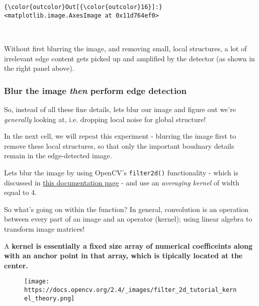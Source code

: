\documentclass[11pt]{article}
\makeatletter
\def\maxwidth{\ifdim\Gin@nat@width>\linewidth\linewidth
    \else\Gin@nat@width\fi}
\let\Oldincludegraphics\includegraphics
\renewcommand{\includegraphics}[1]{\Oldincludegraphics[width=.8\maxwidth]{#1}}
\makeatother
\begin{document}
\begin{Verbatim}[commandchars=\\\{\}]
{\color{outcolor}Out[{\color{outcolor}16}]:} <matplotlib.image.AxesImage at 0x11d764ef0>
\end{Verbatim}
            
    \begin{center}
    \end{center}
    { \hspace*{\fill} \\}
    
    Without first blurring the image, and removing small, local structures,
a lot of irrelevant edge content gets picked up and amplified by the
detector (as shown in the right panel above).

    \subsubsection{\texorpdfstring{Blur the image \emph{then} perform edge
detection}{Blur the image then perform edge detection}}\label{blur-the-image-then-perform-edge-detection}

So, instead of all these fine details, lets blur our image and figure
out we're \emph{generally} looking at, i.e. dropping local noise for
global structure!

In the next cell, we will repeat this experiment - blurring the image
first to remove these local structures, so that only the important
boudnary details remain in the edge-detected image.

Lets blur the image by using OpenCV's \texttt{filter2d()} functionality
- which is discussed in
\href{http://docs.opencv.org/3.1.0/d4/d13/tutorial_py_filtering.html}{this
documentation page} - and use an \emph{averaging kernel} of width equal
to 4.

So what's going on within the function? In general, convolution is an
operation between every part of an image and an operator (kernel); using
linear algebra to transform image matrices!

A \textbf{kernel is essentially a fixed size array of numerical
coefficeints along with an anchor point in that array, which is
tipically located at the center.}

\begin{figure}
\centering
\texttt{[image: https://docs.opencv.org/2.4/\_images/filter\_2d\_tutorial\_kernel\_theory.png]}
\caption{}
\end{figure}
\end{document}
